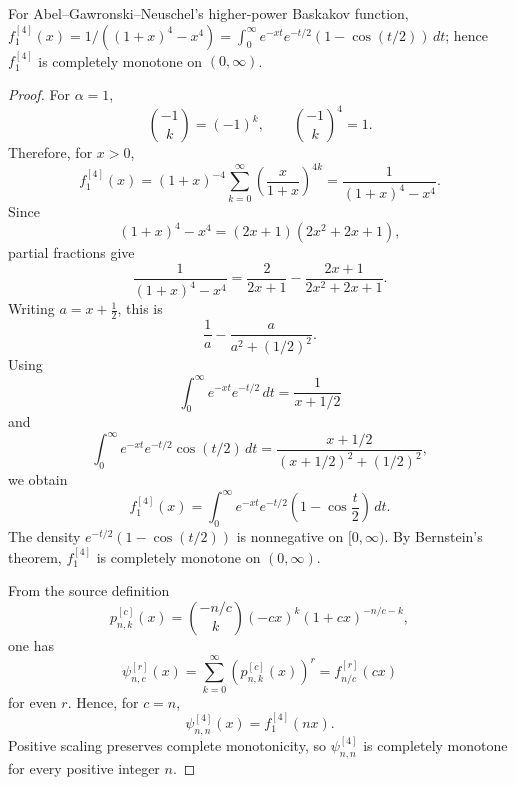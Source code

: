\begin{lemma}[Baskakov higher power seed r=4 alpha=1 has positive Laplace density and is completely m...]
\label{res:baskakov-r4-alpha1-laplace-density-seed}
For Abel--Gawronski--Neuschel's higher-power Baskakov function, \(f^{[4]}_1(x)=1/((1+x)^4-x^4)=\int_0^\infty e^{-xt}e^{-t/2}(1-\cos(t/2))\,dt\); hence \(f^{[4]}_1\) is completely monotone on \((0,\infty)\).
\end{lemma}
\begin{proof}
For \(\alpha=1\),
\[
\binom{-1}{k}=(-1)^k,
\qquad
\binom{-1}{k}^{4}=1.
\]
Therefore, for \(x>0\),
\[
f^{[4]}_1(x)
=(1+x)^{-4}\sum_{k=0}^{\infty}
\left(\frac{x}{1+x}\right)^{4k}
=\frac{1}{(1+x)^4-x^4}.
\]
Since
\[
(1+x)^4-x^4=(2x+1)(2x^2+2x+1),
\]
partial fractions give
\[
\frac{1}{(1+x)^4-x^4}
=\frac{2}{2x+1}-\frac{2x+1}{2x^2+2x+1}.
\]
Writing \(a=x+\frac12\), this is
\[
\frac{1}{a}-\frac{a}{a^2+(1/2)^2}.
\]
Using
\[
\int_0^\infty e^{-xt}e^{-t/2}\,dt=\frac{1}{x+1/2}
\]
and
\[
\int_0^\infty e^{-xt}e^{-t/2}\cos(t/2)\,dt
=\frac{x+1/2}{(x+1/2)^2+(1/2)^2},
\]
we obtain
\[
f^{[4]}_1(x)
=\int_0^\infty e^{-xt}e^{-t/2}\left(1-\cos\frac{t}{2}\right)\,dt.
\]
The density \(e^{-t/2}(1-\cos(t/2))\) is nonnegative on \([0,\infty)\). By Bernstein's theorem, \(f^{[4]}_1\) is completely monotone on \((0,\infty)\).

From the source definition
\[
p^{[c]}_{n,k}(x)=\binom{-n/c}{k}(-cx)^k(1+cx)^{-n/c-k},
\]
one has
\[
\psi^{[r]}_{n,c}(x)=\sum_{k=0}^{\infty}\left(p^{[c]}_{n,k}(x)\right)^r
=f^{[r]}_{n/c}(cx)
\]
for even \(r\). Hence, for \(c=n\),
\[
\psi^{[4]}_{n,n}(x)=f^{[4]}_1(nx).
\]
Positive scaling preserves complete monotonicity, so \(\psi^{[4]}_{n,n}\) is completely monotone for every positive integer \(n\).
\end{proof}

